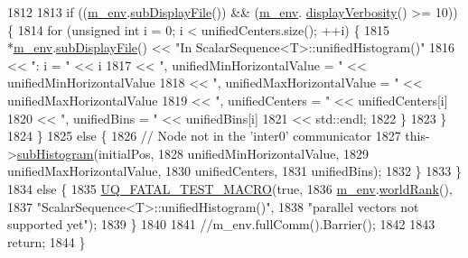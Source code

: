 \begin{DoxyCode}
1812 
1813       \textcolor{keywordflow}{if} ((\hyperlink{class_q_u_e_s_o_1_1_scalar_sequence_a71618cd6351b29361b437af68447a4c8}{m\_env}.\hyperlink{class_q_u_e_s_o_1_1_base_environment_a8a0064746ae8dddfece4229b9ad374d6}{subDisplayFile}()) && (\hyperlink{class_q_u_e_s_o_1_1_scalar_sequence_a71618cd6351b29361b437af68447a4c8}{m\_env}.
      \hyperlink{class_q_u_e_s_o_1_1_base_environment_a1fe5f244fc0316a0ab3e37463f108b96}{displayVerbosity}() >= 10)) \{
1814         \textcolor{keywordflow}{for} (\textcolor{keywordtype}{unsigned} \textcolor{keywordtype}{int} i = 0; i < unifiedCenters.size(); ++i) \{
1815           *\hyperlink{class_q_u_e_s_o_1_1_scalar_sequence_a71618cd6351b29361b437af68447a4c8}{m\_env}.\hyperlink{class_q_u_e_s_o_1_1_base_environment_a8a0064746ae8dddfece4229b9ad374d6}{subDisplayFile}() << \textcolor{stringliteral}{"In ScalarSequence<T>::unifiedHistogram()"}
1816                                   << \textcolor{stringliteral}{": i = "} << i
1817                                   << \textcolor{stringliteral}{", unifiedMinHorizontalValue = "} << unifiedMinHorizontalValue
1818                                   << \textcolor{stringliteral}{", unifiedMaxHorizontalValue = "} << unifiedMaxHorizontalValue
1819                                   << \textcolor{stringliteral}{", unifiedCenters = "}            << unifiedCenters[i]
1820                                   << \textcolor{stringliteral}{", unifiedBins = "}               << unifiedBins[i]
1821                                   << std::endl;
1822         \}
1823       \}
1824     \}
1825     \textcolor{keywordflow}{else} \{
1826       \textcolor{comment}{// Node not in the 'inter0' communicator}
1827       this->\hyperlink{class_q_u_e_s_o_1_1_scalar_sequence_a80e9aa5156dfaedbdc5ecd0fee6acb9f}{subHistogram}(initialPos,
1828                          unifiedMinHorizontalValue,
1829                          unifiedMaxHorizontalValue,
1830                          unifiedCenters,
1831                          unifiedBins);
1832     \}
1833   \}
1834   \textcolor{keywordflow}{else} \{
1835     \hyperlink{_defines_8h_a56d63d18d0a6d45757de47fcc06f574d}{UQ\_FATAL\_TEST\_MACRO}(\textcolor{keyword}{true},
1836                         \hyperlink{class_q_u_e_s_o_1_1_scalar_sequence_a71618cd6351b29361b437af68447a4c8}{m\_env}.\hyperlink{class_q_u_e_s_o_1_1_base_environment_a78b57112bbd0e6dd0e8afec00b40ffa7}{worldRank}(),
1837                         \textcolor{stringliteral}{"ScalarSequence<T>::unifiedHistogram()"},
1838                         \textcolor{stringliteral}{"parallel vectors not supported yet"});
1839   \}
1840 
1841   \textcolor{comment}{//m\_env.fullComm().Barrier();}
1842 
1843   \textcolor{keywordflow}{return};
1844 \}
\end{DoxyCode}
